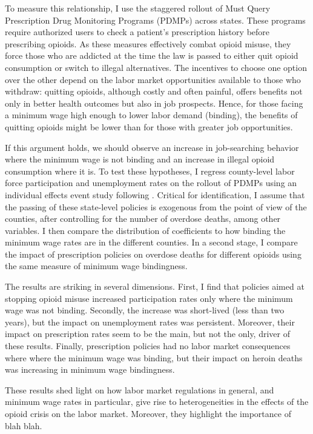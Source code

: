 \documentclass[12pt,a4paper]{article}
\begin{document}
To measure this relationship, I use the staggered rollout of Must Query Prescription Drug Monitoring Programs (PDMPs) across states.
These programs require authorized users to check a patient's prescription history before prescribing opioids.
As these measures effectively combat opioid misuse, they force those who are addicted at the time the law is passed to either quit opioid consumption or switch to illegal alternatives.
The incentives to choose one option over the other depend on the labor market opportunities available to those who withdraw: quitting opioids, although costly and often painful, offers benefits not only in better health outcomes but also in job prospects. 
Hence, for those facing a minimum wage high enough to lower labor demand (binding), the benefits of quitting opioids might be lower than for those with greater job opportunities.

If this argument holds, we should observe an increase in job-searching behavior where the minimum wage is not binding and an increase in illegal opioid consumption where it is.
To test these hypotheses, I regress county-level labor force participation and unemployment rates on the rollout of PDMPs using an individual effects event study following \textcite{arkhangelsky2024flexible}.
Critical for identification, I assume that the passing of these state-level policies is exogenous from the point of view of the counties, after controlling for the number of overdose deaths, among other variables.
I then compare the distribution of coefficients to how binding the minimum wage rates are in the different counties.
In a second stage, I compare the impact of prescription policies on overdose deaths for different opioids using the same measure of minimum wage bindingness.

The results are striking in several dimensions.
First, I find that policies aimed at stopping opioid misuse increased participation rates only where the minimum wage was not binding.
Secondly, the increase was short-lived (less than two years), but the impact on unemployment rates was persistent.
Moreover, their impact on prescription rates seem to be the main, but not the only, driver of these results.
Finally, prescription policies had no labor market consequences where where the minimum wage was binding, but their impact on heroin deaths was increasing in minimum wage bindingness.

These results shed light on how labor market regulations in general, and minimum wage rates in particular, give rise to heterogeneities in the effects of the opioid crisis on the labor market.
Moreover, they highlight the importance of blah blah.
\end{document}

